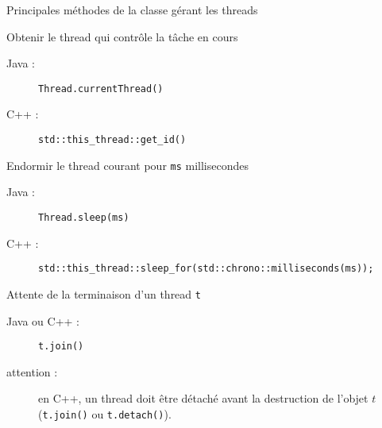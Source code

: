 
\begingroup

\begin{frame}[fragile]{Principales méthodes de la classe gérant les threads}

  \begin{block}{Obtenir le thread qui contrôle la tâche en cours}
    \begin{description}
    \item[Java :] \lstinline|Thread.currentThread()| \hfill
    \item[C++ :] \lstinline|std::this_thread::get_id()|
    \end{description}
  \end{block}

  \pause
  \vfill

  \begin{block}{Endormir le thread courant pour \lstinline{ms} millisecondes}
    \begin{description}
    \item[Java :] \lstinline|Thread.sleep(ms)| \hfill
    \item[C++ :] \lstinline|std::this_thread::sleep_for(std::chrono::milliseconds(ms));|
    \end{description}
  \end{block}

  \pause
  \vfill

  \begin{block}{Attente de la terminaison d'un thread \lstinline{t}}
    \begin{description}
    \item[Java ou C++ :] \lstinline|t.join()|
    \item [\alert{ attention :}] en C++, un thread doit être détaché avant la destruction de l'objet $t$ (\lstinline|t.join()| ou \lstinline|t.detach()|). 
    \end{description}
  \end{block}

\end{frame}

\endgroup
\endinput
